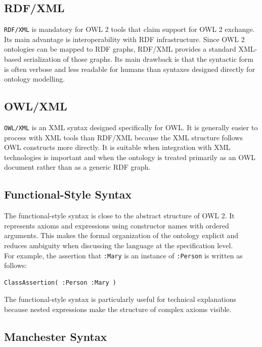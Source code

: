 \documentclass{scrbook}
\begin{document}
	\subsection{RDF/XML}
	
	\texttt{RDF/XML} is mandatory for OWL 2 tools that claim support for OWL 2 exchange. Its main advantage is interoperability with RDF infrastructure. Since OWL 2 ontologies can be mapped to RDF graphs, RDF/XML provides a standard XML-based serialization of those graphs. Its main drawback is that the syntactic form is often verbose and less readable for humans than syntaxes designed directly for ontology modelling.
	
	\subsection{OWL/XML}
	
	\texttt{OWL/XML} is an XML syntax designed specifically for OWL. It is generally easier to process with XML tools than RDF/XML because the XML structure follows OWL constructs more directly. It is suitable when integration with XML technologies is important and when the ontology is treated primarily as an OWL document rather than as a generic RDF graph.
	
	\subsection{Functional-Style Syntax}
	
	The functional-style syntax is close to the abstract structure of OWL 2. It represents axioms and expressions using constructor names with ordered arguments. This makes the formal organization of the ontology explicit and reduces ambiguity when discussing the language at the specification level.\\
	
	For example, the assertion that \texttt{:Mary} is an instance of \texttt{:Person} is written as follows:
	\begin{lstlisting}
ClassAssertion( :Person :Mary )
	\end{lstlisting}
	
	The functional-style syntax is particularly useful for technical explanations because nested expressions make the structure of complex axioms visible.
	
	\subsection{Manchester Syntax}
	
\end{document}
